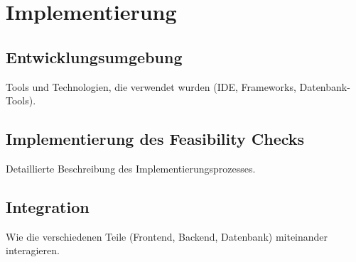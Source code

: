 \chapter{Implementierung}
	
\section{Entwicklungsumgebung}
Tools und Technologien, die verwendet wurden (IDE, Frameworks, Datenbank-Tools).
\section{Implementierung des Feasibility Checks}
Detaillierte Beschreibung des Implementierungsprozesses.
\section{Integration}
Wie die verschiedenen Teile (Frontend, Backend, Datenbank) miteinander interagieren.
